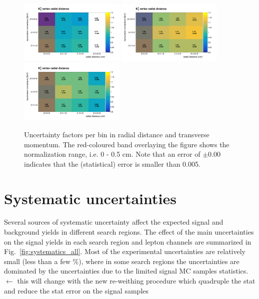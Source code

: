 \begin{figure}[h]
	\centering	
	\includegraphics[width=0.45\textwidth]{Figures/c6/efficiencies/2dplots/2016tot/smallrange}
	\includegraphics[width=0.45\textwidth]{Figures/c6/efficiencies/2dplots/2017tot/smallrange}
	\\
	\includegraphics[width=0.45\textwidth]{Figures/c6/efficiencies/2dplots/2018tot/smallrange}
	\caption{Uncertainty factors per bin in radial distance and transverse momentum. The red-coloured band overlaying the figure shows the normalization range, i.e. 0 - 0.5 cm. Note that an error of $\pm 0.00$ indicates that the (statistical) error is smaller than 0.005.}
	\label{fig:2dplots}
\end{figure}

\clearpage
\section{Systematic uncertainties}\label{sec:llsystematic}
Several sources of systematic uncertainty affect the expected signal
and background yields in different search regions. 
The effect of the main uncertainties on the signal yields in each
search region and lepton channels are summarized in
Fig.~\ref{fig:systematics_all}. 
Most of the experimental uncertainties are relatively small (less than
a few \%), where in some search regions the uncertainties are
dominated by the uncertainties due to the limited signal MC samples statistics. 
{\color{red}
  $\leftarrow$ this
  will change with the new re-weithing procedure which quadruple the
  stat and reduce the stat error on the signal samples}

